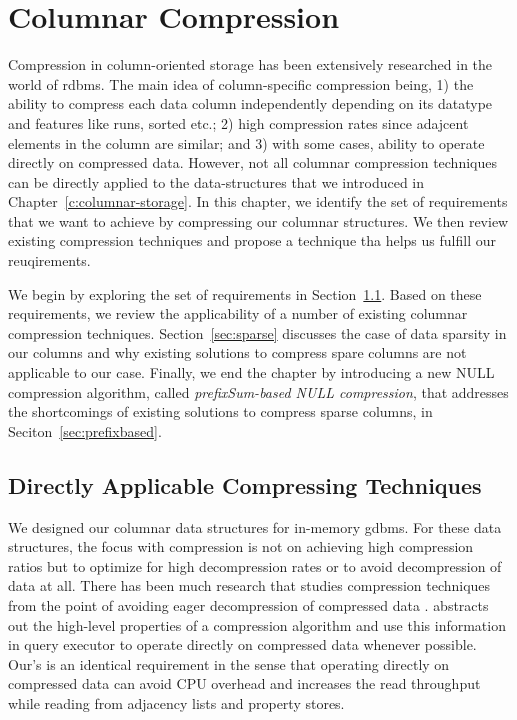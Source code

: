 \chapter{Columnar Compression}
\label{columnar-compression}

Compression in column-oriented storage has been extensively researched \cite{abadi-col-comp, abadi-sparse-col, boncz-comp} in the world of \gls{rdbms}. The main idea of column-specific compression being, 1) the ability to compress each data column independently depending on its datatype and features like runs, sorted etc.; 2) high compression rates since adajcent elements in the column are similar; and 3) with some cases, ability to operate directly on compressed data. However, not all columnar compression techniques can be directly applied to the data-structures that we introduced in Chapter~\ref{c:columnar-storage}. In this chapter, we identify the set of requirements that we want to achieve by compressing our columnar structures. We then review existing compression techniques and propose a technique tha helps us fulfill our reuqirements.

We begin by exploring the set of requirements in Section~\ref{sec:col-existing}. Based on these requirements, we review the applicability of a number of existing columnar compression techniques. Section~\ref{sec:sparse} discusses the case of data sparsity in our columns and why existing solutions to compress spare columns are not applicable to our case. Finally, we end the chapter by introducing a new NULL compression algorithm, called \emph{prefixSum-based NULL compression}, that addresses the shortcomings of existing solutions to compress sparse columns, in Seciton~\ref{sec:prefixbased}.

\section{Directly Applicable Compressing Techniques}
\label{sec:col-existing}

We designed our columnar data structures for in-memory \gls{gdbms}. For these data structures, the focus with compression is not on achieving high compression ratios but to optimize for high decompression rates or to avoid decompression of data at all. There has been much research that studies compression techniques from the point of avoiding eager decompression of compressed data \cite{westmann-comp, dat-comp}. \cite{abadi-col-comp} abstracts out the high-level properties of a compression algorithm and use this information in query executor to operate directly on compressed data whenever possible. Our's is an identical requirement in the sense that operating directly on compressed data can avoid CPU overhead and increases the read throughput while reading from adjacency lists and property stores.

